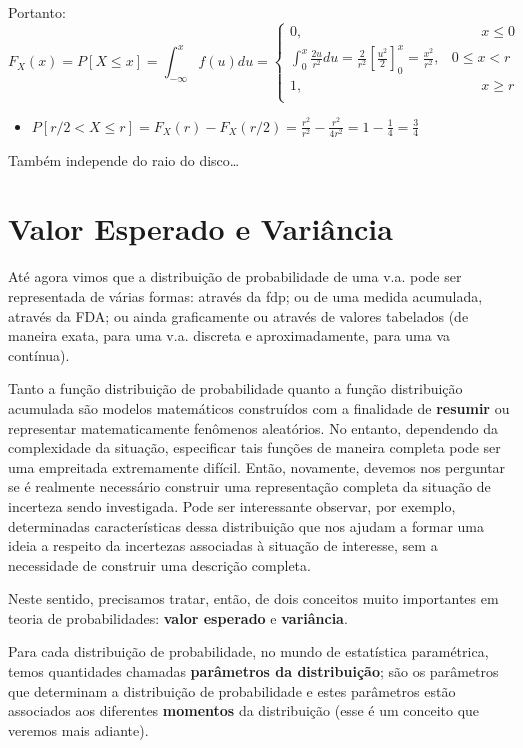 \documentclass[
]{book}
\providecommand{\tightlist}{%
  \setlength{\itemsep}{0pt}\setlength{\parskip}{0pt}}
\theoremstyle{definition}
\theoremstyle{definition}
\theoremstyle{definition}
\theoremstyle{remark}
\begin{document}
Portanto:
\[F_X(x) = P[X\leq x] = \int_{-\infty}^{x} f(u)du =
  \begin{cases}
    0, & \phantom{0 \leq \;} x \leq 0\\ 
    \int_{0}^{x} \frac{2u} {r^2} du  = \frac{2}{r^2} \left[ \frac{u^2}{2} \right]_{0}^{x} = \frac{x^2}{r^2}, & 0 \leq x < r \\
    1, & \phantom{0 \leq \;} x \geq r\\
  \end{cases}\]

\begin{itemize}
\tightlist
\item
  \(P[r/2 < X \leq r] = F_X(r) - F_X(r/2) = \frac{r^2}{r^2} - \frac{r^2}{4r^2} = 1 - \frac{1}{4} = \frac{3}{4}\)
\end{itemize}

Também independe do raio do disco\ldots{}

\hypertarget{valor-esperado-e-variuxe2ncia}{%
\section{Valor Esperado e Variância}\label{valor-esperado-e-variuxe2ncia}}

Até agora vimos que a distribuição de probabilidade de uma v.a. pode ser representada de várias formas: através da fdp; ou de uma medida acumulada, através da FDA; ou ainda graficamente ou através de valores tabelados (de maneira exata, para uma v.a. discreta e aproximadamente, para uma va contínua).

Tanto a função distribuição de probabilidade quanto a função distribuição acumulada são modelos matemáticos construídos com a finalidade de \textbf{resumir} ou representar matematicamente fenômenos aleatórios. No entanto, dependendo da complexidade da situação, especificar tais funções de maneira completa pode ser uma empreitada extremamente difícil. Então, novamente, devemos nos perguntar se é realmente necessário construir uma representação completa da situação de incerteza sendo investigada. Pode ser interessante observar, por exemplo, determinadas características dessa distribuição que nos ajudam a formar uma ideia a respeito da incertezas associadas à situação de interesse, sem a necessidade de construir uma descrição completa.

Neste sentido, precisamos tratar, então, de dois conceitos muito importantes em teoria de probabilidades: \textbf{valor esperado} e \textbf{variância}.

Para cada distribuição de probabilidade, no mundo de estatística paramétrica, temos quantidades chamadas \textbf{parâmetros da distribuição}; são os parâmetros que determinam a distribuição de probabilidade e estes parâmetros estão associados aos diferentes \textbf{momentos} da distribuição (esse é um conceito que veremos mais adiante).
\end{document}
